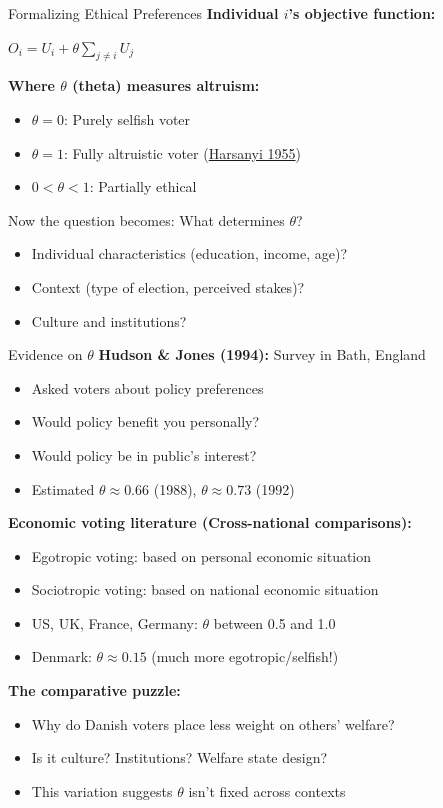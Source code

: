\documentclass[10pt]{beamer}
\begin{document}
\begin{frame}{Formalizing Ethical Preferences}
\textbf{Individual $i$'s objective function:}


\begin{center}
\Large
$O_i = U_i + \theta \sum_{j \neq i} U_j$
\end{center}


\textbf{Where $\theta$ (theta) measures altruism:}
\begin{itemize}
\item $\theta = 0$: Purely selfish voter
\item $\theta = 1$: Fully altruistic voter (\href{https://www.journals.uchicago.edu/doi/abs/10.1086/257678}{Harsanyi 1955})
\item $0 < \theta < 1$: Partially ethical
\end{itemize}


Now the question becomes: What determines $\theta$?
\begin{itemize}
\item Individual characteristics (education, income, age)?
\item Context (type of election, perceived stakes)?
\item Culture and institutions?
\end{itemize}
\end{frame}

\begin{frame}{Evidence on $\theta$}
\textbf{Hudson \& Jones (1994):} Survey in Bath, England
\begin{itemize}
\item Asked voters about policy preferences
\item Would policy benefit you personally?
\item Would policy be in public's interest?
\item Estimated $\theta \approx 0.66$ (1988), $\theta \approx 0.73$ (1992)
\end{itemize}


\textbf{Economic voting literature (Cross-national comparisons):}
\begin{itemize}
\item Egotropic voting: based on personal economic situation
\item Sociotropic voting: based on national economic situation
\item US, UK, France, Germany: $\theta$ between 0.5 and 1.0
\item \alert{Denmark: $\theta \approx 0.15$} (much more egotropic/selfish!)
\end{itemize}


\textbf{The comparative puzzle:}
\begin{itemize}
\item Why do Danish voters place less weight on others' welfare?
\item Is it culture? Institutions? Welfare state design?
\item This variation suggests $\theta$ isn't fixed across contexts
\end{itemize}
\end{frame}
\end{document}
